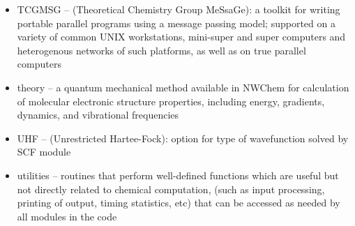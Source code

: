 \begin{itemize}
\item TCGMSG -- (Theoretical Chemistry Group MeSsaGe): a toolkit for 
writing portable parallel 
programs using a message passing model; supported on a variety of common
UNIX workstations, mini-super and super computers and heterogenous
networks of such platforms, as well as on true parallel computers

\item theory -- a quantum mechanical method available in NWChem for
calculation
of molecular electronic structure properties, including energy, gradients,
dynamics, and vibrational frequencies

\item UHF -- (Unrestricted Hartee-Fock): option for type of wavefunction
solved by SCF module

\item utilities -- routines that perform well-defined functions which are
useful but not directly related to chemical computation, (such as input
processing, printing of output, timing statistics, etc) that can be  
accessed as needed by all modules in the code 



\end{itemize}
